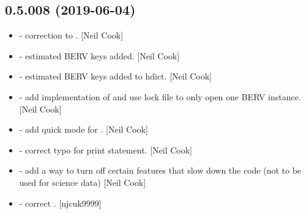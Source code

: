 \documentclass[a4paper,10pt,english]{report}
\begin{document}
\subsection{0.5.008 (2019-06-04)}
\label{\detokenize{misc/changelog:id129}}\begin{itemize}
\item {} 
 - correction to . {[}Neil Cook{]}

\item {} 
 - estimated BERV keys added. {[}Neil Cook{]}

\item {} 
 - estimated BERV keys added to hdict. {[}Neil
Cook{]}

\item {} 
 - add implementation of  and use lock file to
only open one BERV instance. {[}Neil Cook{]}

\item {} 
 - add quick mode for . {[}Neil Cook{]}

\item {} 
 - correct typo for print statement. {[}Neil Cook{]}

\item {} 
 - add a way to turn off certain features that
slow down the code (not to be used for science data) {[}Neil Cook{]}

\item {} 
 - correct . {[}njcuk9999{]}

\end{itemize}
\end{document}
